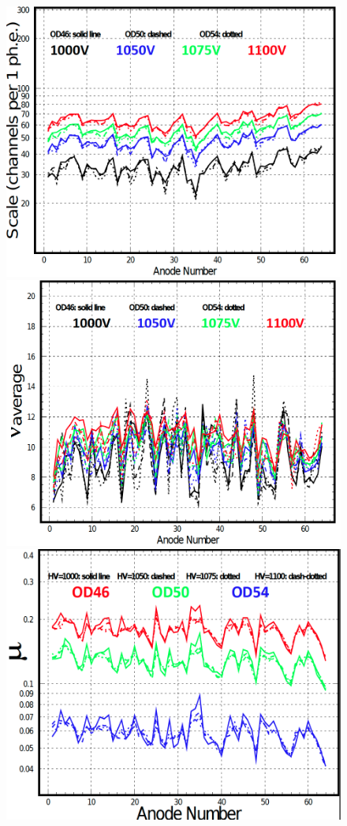 \documentclass[5p,times,twocolumn]{elsarticle}
\begin{document}
\begin{figure}[h]
\begin{center}
	\includegraphics[width=0.85\linewidth]{Pavel_pass1.png}
	\includegraphics[width=0.85\linewidth]{Pavel_pass2.png}
	\includegraphics[width=0.85\linewidth]{Pavel_pass3.png}

\end{center}
\end{figure}
\end{document}
